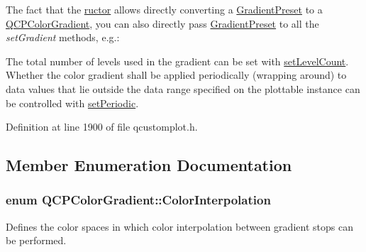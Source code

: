 The fact that the \hyperlink{class_q_c_p_color_gradient}{ructor} allows directly converting a \hyperlink{class_q_c_p_color_gradient_aed6569828fee337023670272910c9072}{Gradient\+Preset} to a \hyperlink{class_q_c_p_color_gradient}{Q\+C\+P\+Color\+Gradient}, you can also directly pass \hyperlink{class_q_c_p_color_gradient_aed6569828fee337023670272910c9072}{Gradient\+Preset} to all the {\itshape set\+Gradient} methods, e.\+g.\+: 
\begin{DoxyCodeInclude}
\end{DoxyCodeInclude}
 The total number of levels used in the gradient can be set with \hyperlink{class_q_c_p_color_gradient_a18da587eb4f7fc788ea28ba15b6a12de}{set\+Level\+Count}. Whether the color gradient shall be applied periodically (wrapping around) to data values that lie outside the data range specified on the plottable instance can be controlled with \hyperlink{class_q_c_p_color_gradient_a39d6448155fc00a219f239220d14bb39}{set\+Periodic}. 

Definition at line 1900 of file qcustomplot.\+h.



\subsection{Member Enumeration Documentation}
\hypertarget{class_q_c_p_color_gradient_ac5dca17cc24336e6ca176610e7f77fc1}{}
\subsubsection[{Color\+Interpolation}]{\setlength{\rightskip}{0pt plus 5cm}enum {\bf Q\+C\+P\+Color\+Gradient\+::\+Color\+Interpolation}}\label{class_q_c_p_color_gradient_ac5dca17cc24336e6ca176610e7f77fc1}
Defines the color spaces in which color interpolation between gradient stops can be performed.

